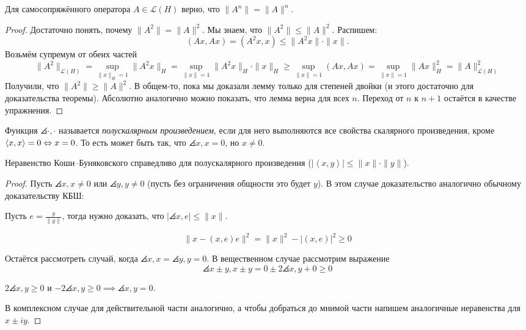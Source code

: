 \begin{lemma}\label{5.4-lemma1}
    Для самосопряжённого оператора $A \in \mathcal{L}(H)$ верно, что
    $\|A^n\| = \|A\|^n$.
\end{lemma}

\begin{proof}
    Достаточно понять, почему $\|A^2\| = \|A\|^2$. Мы знаем, что $\|A^2\| \leqslant \|A\|^2$. Распишем:
    \[
        (Ax, Ax) = (A^2 x, x) \leq \|A^2 x\| \cdot \|x\|.
    \]
    Возьмём супремум от обеих частей
    \[
        \|A^2\|_{\mathcal{L}(H)} = \sup_{\|x\|_H=1} \|A^2 x\|_H = \sup_{\|x\|=1} \|A^2 x\|_H \cdot \| x \|_H \geq \sup_{\|x\|=1} (Ax, Ax) = \sup_{\|x\|=1} \|Ax\|_H^2=\|A\|_{\mathcal{L}(H)}^2
    \]
    Получили, что $\|A^2\| \geqslant \|A\|^2$.
    В общем-то, пока мы доказали лемму только для степеней двойки (и этого достаточно для доказательства теоремы).
    Абсолютно аналогично можно показать, что лемма верна для всех $n$.
    Переход от $n$ к $n+1$ остаётся в качестве упражнения.
\end{proof}

\begin{definition}
    Функция $\angles{\cdot, \cdot}$ называется \textit{полускалярным произведением}, если для него выполняются все свойства скалярного произведения, кроме $\left\langle{x, x}\right\rangle = 0 \Leftrightarrow x = 0$. То есть может быть так, что $\angles{x, x} = 0$, но $x \neq 0$.
\end{definition}

\begin{statement}
    Неравенство Коши--Буняковского справедливо для полускалярного произведения (\(\left| \left\langle x, y \right\rangle \right| \leqslant \|x \| \cdot \|y \|\)).
\end{statement}

\begin{proof}
    Пусть $\angles{x, x} \neq 0$ или $\angles{y, y} \neq 0$ (пусть без ограничения общности это будет $y$). В этом случае доказательство аналогично обычному доказательству КБШ:

    Пусть $e = \frac{y}{\|y\|}$, тогда нужно доказать, что $|\angles{x, e}| \leqslant \| x \| $.

    \[
    \| x - (x, e) e\|^2 = \|x\|^2 - |(x, e)|^2 \geqslant 0
    \]

    Остаётся рассмотреть случай, когда $\angles{x, x} = \angles{y, y} = 0$.
    В вещественном случае рассмотрим выражение 
    \[
    \angles{x \pm y, x \pm y} = 0 \pm 2 \angles{x, y} + 0
    \geqslant 0
    \]

    $2\angles{x, y} \geqslant 0$ и $-2\angles{x, y} \geqslant 0 \implies \angles{x, y} = 0$.

    В комплексном случае для действительной части аналогично, а чтобы добраться до мнимой части напишем аналогичные неравенства для $x \pm iy$.

\end{proof}

